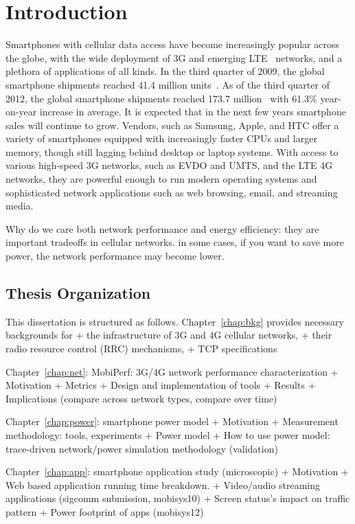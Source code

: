 \chapter{Introduction}   \label{chap:intro}

Smartphones with cellular data access have become increasingly popular across the globe, with the wide deployment of 3G and emerging LTE~\cite{3gpp.lte} networks, and a plethora of applications of all kinds. In the third quarter of 2009, the global smartphone shipments reached 41.4 million units~\cite{smartphoneStat}. As of the third quarter of 2012, the global smartphone shipments reached 173.7 million~\cite{smartphoneStat2} with 61.3\% year-on-year increase in average. It is expected that in the next few years smartphone sales will continue to grow.  Vendors, such as Samsung, Apple, and HTC offer a variety of smartphones equipped with increasingly faster CPUs and larger memory, though still lagging behind desktop or laptop systems. With access to various high-speed 3G networks, such as EVDO and UMTS, and the LTE 4G networks, they are powerful enough to run modern operating systems and sophisticated network applications such as web browsing, email, and streaming media. 

Why do we care both network performance and energy efficiency: they are important tradeoffs in cellular networks. in some cases, if you want to save more power, the network performance may become lower.

\section{Thesis Organization}

This dissertation is structured as follows. Chapter~\ref{chap:bkg} provides necessary backgrounds for 
+ the infrastructure of 3G and 4G cellular networks, 
+ their radio resource control (RRC) mechanisms, 
+ TCP specifications

Chapter~\ref{chap:net}: MobiPerf: 3G/4G network performance characterization
	+ Motivation
	+ Metrics
	+ Design and implementation of tools
	+ Results
	+ Implications (compare across network types, compare over time)
	
Chapter~\ref{chap:power}: smartphone power model
	+ Motivation
	+ Measurement methodology: tools, experiments
	+ Power model
	+ How to use power model: trace-driven network/power simulation methodology (validation)
	
Chapter~\ref{chap:app}: smartphone application study (microscopic)
	+ Motivation
	+ Web based application running time breakdown.
	+ Video/audio streaming applications (sigcomm submission, mobisys10)
	+ Screen status's impact on traffic pattern
	+ Power footprint of apps (mobisys12)
	
